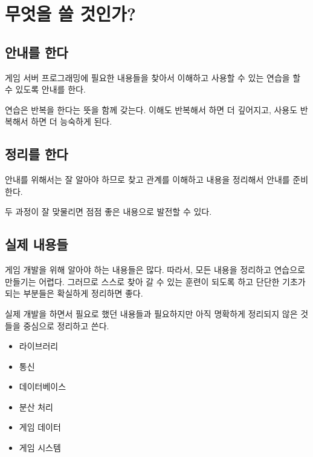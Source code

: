 \chapter{무엇을 쓸 것인가?}

\section{안내를 한다}

게임 서버 프로그래밍에 필요한 내용들을 찾아서 이해하고 사용할 수 있는 연습을 
할 수 있도록 안내를 한다. 

연습은 반복을 한다는 뜻을 함께 갖는다. 이해도 반복해서 하면 더 깊어지고, 사용도 
반복해서 하면 더 능숙하게 된다. 

\section{정리를 한다}

안내를 위해서는 잘 알아야 하므로 찾고 관계를 이해하고 내용을 정리해서 
안내를 준비한다. 

두 과정이 잘 맞물리면 점점 좋은 내용으로 발전할 수 있다. 

\section{실제 내용들}

게임 개발을 위해 알아야 하는 내용들은 많다. 따라서, 모든 내용을 정리하고 연습으로 
만들기는 어렵다. 그러므로 스스로 찾아 갈 수 있는 훈련이 되도록 하고 단단한 기초가 
되는 부분들은 확실하게 정리하면 좋다. 

실제 개발을 하면서 필요로 했던 내용들과 필요하지만 아직 명확하게 정리되지 않은 것들을 
중심으로 정리하고 쓴다. 

\begin{itemize}
    \item 라이브러리 
    \item 통신
    \item 데이터베이스 
    \item 분산 처리 
    \item 게임 데이터 
    \item 게임 시스템 
\end{itemize}

